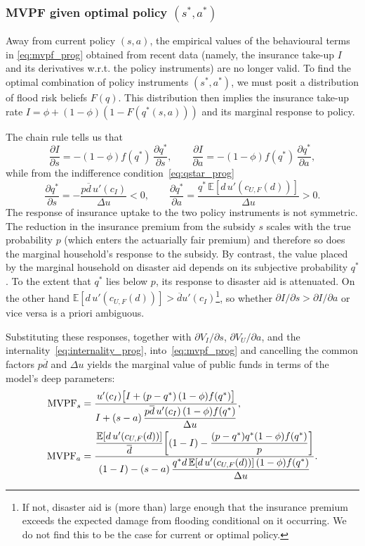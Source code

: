 \documentclass[12pt]{article}
\begin{document}
\subsubsection{MVPF given optimal policy $(s^*,a^*)$}
Away from current policy $(s,a)$, the empirical values of the behavioural terms in \eqref{eq:mvpf_prog} obtained from recent data (namely, the insurance take-up $I$ and its derivatives w.r.t. the policy instruments) are no longer valid. To find the optimal combination of policy instruments $(s^*,a^*)$, we must posit a distribution of flood risk beliefs $F(q)$. This distribution then implies the insurance take-up rate $I=\phi+(1-\phi)(1-F(q^*(s,a)))$ and its marginal response to policy.


The chain rule tells us that 
\begin{equation}\label{eq:partialsinsurance}
    \frac{\partial I}{\partial s} = -(1-\phi)f(q^*)\,\frac{\partial q^*}{\partial s}, \qquad
    \frac{\partial I}{\partial a} = -(1-\phi)f(q^*)\,\frac{\partial q^*}{\partial a},
\end{equation}
while from the indifference condition~\eqref{eq:qstar_prog} 
\begin{equation}\label{eq:partialsqstar}
    \frac{\partial q^*}{\partial s} = -\frac{p\overline{d}\,u'(c_I)}{\Delta u} < 0, \qquad
    \frac{\partial q^*}{\partial a} = \frac{q^*\,\mathbb{E}[d\,u'(c_{U,F}(d))]}{\Delta u} > 0.
\end{equation}
The response of insurance uptake to the two policy instruments is not symmetric. The reduction in the insurance premium from the subsidy $s$ scales with the true probability $p$ (which enters the actuarially fair premium) and therefore so does the marginal household's response to the subsidy. By contrast, the value placed by the marginal household on disaster aid depends on its subjective probability $q^*$. To the extent that $q^*$ lies below $p$, its response to disaster aid is attenuated. On the other hand $\mathbb{E}[d\,u'(c_{U,F}(d))]>\overline{d}u'(c_I)$\footnote{If not, disaster aid is (more than) large enough that the insurance premium exceeds the expected damage from flooding conditional on it occurring. We do not find this to be the case for current or optimal policy.}, so whether $\partial I/\partial s>\partial I/\partial a$ or vice versa is a priori ambiguous.


Substituting these responses, together with $\partial V_I/\partial s$, $\partial V_U/\partial a$, and the internality~\eqref{eq:internality_prog}, into~\eqref{eq:mvpf_prog} and cancelling the common factors $p\overline{d}$ and $\Delta u$ yields the marginal value of public funds in terms of the model's deep parameters:
\begin{align}
    \text{MVPF}_s &= \frac{u'(c_I)\bigl[I + (p-q^*)\,(1-\phi)f(q^*)\bigr]}{I + (s-a)\,\dfrac{p\overline{d}\,u'(c_I)\,(1-\phi)f(q^*)}{\Delta u}}, \notag \\
    \text{MVPF}_a &= \frac{\dfrac{\mathbb{E}[d\,u'(c_{U,F}(d))]}{\overline{d}} \! \left[(1-I) - \dfrac{(p-q^*)q^*(1-\phi)f(q^*)}{p}\right]}{(1-I) - (s-a)\,\dfrac{q^*d\,\mathbb{E}[d\,u'(c_{U,F}(d))]\,(1-\phi)f(q^*)}{\Delta u}}. \label{eq:mvpf_deep_prog}
\end{align}
\end{document}
